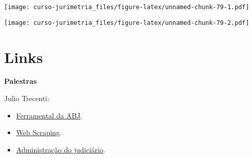 \documentclass[]{book}
\newenvironment{Shaded}{\begin{snugshade}}{\end{snugshade}}
\newcommand{\KeywordTok}[1]{\textcolor[rgb]{0.13,0.29,0.53}{\textbf{{#1}}}}
\newcommand{\DataTypeTok}[1]{\textcolor[rgb]{0.13,0.29,0.53}{{#1}}}
\newcommand{\DecValTok}[1]{\textcolor[rgb]{0.00,0.00,0.81}{{#1}}}
\newcommand{\StringTok}[1]{\textcolor[rgb]{0.31,0.60,0.02}{{#1}}}
\newcommand{\NormalTok}[1]{{#1}}
\providecommand{\tightlist}{%
  \setlength{\itemsep}{0pt}\setlength{\parskip}{0pt}}
\begin{document}
\texttt{[image: curso-jurimetria\_files/figure-latex/unnamed-chunk-79-1.pdf]}

\begin{Shaded}
\end{Shaded}

\texttt{[image: curso-jurimetria\_files/figure-latex/unnamed-chunk-79-2.pdf]}

\chapter{Links}\label{links}

\textbf{Palestras}

Julio Trecenti:

\begin{itemize}
\tightlist
\item
  \href{http://rpubs.com/julio_trecenti/ferramental}{Ferramental da
  ABJ}.
\item
  \href{http://rpubs.com/julio_trecenti/scrape}{Web Scraping}.
\item
  \href{http://rpubs.com/julio_trecenti/adm}{Administração do
  judiciário}.
\end{itemize}
\end{document}
